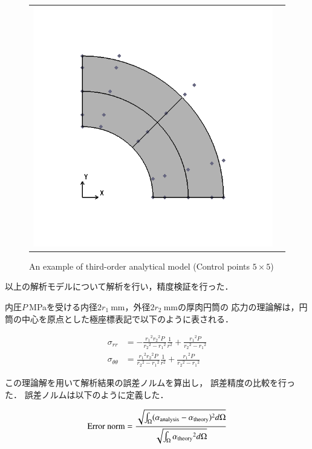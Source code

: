 \begin{figure}[htbp]
\begin{tabular}{cc}
\begin{minipage}[t]{0.45\hsize}
      \includegraphics[keepaspectratio, scale=0.3]
      {fig/result_data_etc/iga/order3/model.png}
      \caption{An example of third-order analytical model (Control points $5\times 5$)}
      \label{fig:iga order 3}
    \end{minipage}
  \end{tabular}
\end{figure}

\noindent
以上の解析モデルについて解析を行い，精度検証を行った．

内圧$P\ $MPaを受ける内径$2r_1\ $mm，外径$2r_2\ $mmの厚肉円筒の
応力の理論解は，円筒の中心を原点とした極座標表記で以下のように表される．

\begin{align}
  \sigma_{rr} &= -\frac{{r_1}^2{r_2}^2P}{{r_2}^2-{r_1}^2}\frac{1}{r^2}
              +\frac{{r_1}^2P}{{r_2}^2-{r_1}^2}\\
  \sigma_{\theta\theta} &= \frac{{r_1}^2{r_2}^2P}{{r_2}^2-{r_1}^2}\frac{1}{r^2}
                   +\frac{{r_1}^2P}{{r_2}^2-{r_1}^2}
\end{align}

\noindent
この理論解を用いて解析結果の誤差ノルムを算出し，
誤差精度の比較を行った．
誤差ノルムは以下のように定義した．

\begin{equation}
  {\rm{Error\ norm}} = \frac{\sqrt{\int_{\Omega}(\alpha_{\rm{analysis}}-\alpha_{\rm{theory}})^2 d\Omega}}{\sqrt{\int_{\Omega}{\alpha_{\rm{theory}}}^2 d\Omega}}
\end{equation}

